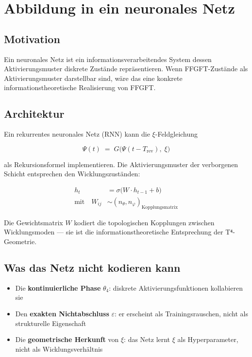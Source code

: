 \section{Abbildung in ein neuronales Netz}

\subsection{Motivation}

Ein neuronales Netz ist ein informationsverarbeitendes System dessen
Aktivierungsmuster diskrete Zustände repräsentieren. Wenn FFGFT-Zustände
als Aktivierungsmuster darstellbar sind, wäre das eine konkrete
informationstheoretische Realisierung von FFGFT.

\subsection{Architektur}

Ein rekurrentes neuronales Netz (RNN) kann die $\xi$-Feldgleichung

\begin{equation}
  \Psi(t) \;=\; G\bigl(\Psi(t - T_\text{rev}),\; \xi\bigr)
  \tag{243.4}
\end{equation}

als Rekursionsformel implementieren. Die Aktivierungsmuster der
verborgenen Schicht entsprechen den Wicklungszuständen:

\begin{align}
  h_t &= \sigma\bigl(W \cdot h_{t-1} + b\bigr) \tag{243.5} \\
  \text{mit}\quad W_{ij} &\sim (n_\theta, n_\varphi)_\text{Kopplungsmatrix}
  \tag{243.6}
\end{align}

Die Gewichtsmatrix $W$ kodiert die topologischen Kopplungen zwischen
Wicklungsmoden --- sie ist die informationstheoretische Entsprechung
der T⁴-Geometrie.

\subsection{Was das Netz nicht kodieren kann}

\begin{itemize}
  \item Die \textbf{kontinuierliche Phase} $\theta_4$: diskrete
        Aktivierungsfunktionen kollabieren sie
  \item Den \textbf{exakten Nichtabschluss} $\varepsilon$: er
        erscheint als Trainingsrauschen, nicht als strukturelle Eigenschaft
  \item Die \textbf{geometrische Herkunft} von $\xi$: das Netz lernt
        $\xi$ als Hyperparameter, nicht als Wicklungsverhältnis
\end{itemize}

